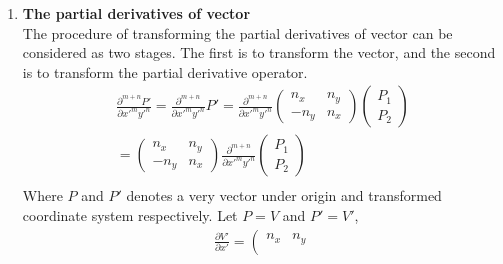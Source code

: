 \documentclass[review]{elsarticle}
\begin{document}
\begin{enumerate}
\begin{equation}
\begin{gathered}
				+\left(n_x^2-n_y^2\right)\frac{\partial^2}{\partial x\partial y} \right)P,
	\end{gathered}
	\end{equation}
	\begin{equation}\label{TPSPy2}
	\begin{gathered}
		\frac{\partial^2{P'}}{\partial{y'^2}} 
			= \left( n_y^2\frac{\partial^2}{\partial x^2}-2n_xn_y\frac{\partial^2}{\partial x\partial y}
				+n_x^2\frac{\partial^2}{\partial y^2}\right)P.
	\end{gathered}
	\end{equation}
	\item \textbf{The partial derivatives of vector}\\
	The procedure of transforming the partial derivatives of vector can be considered as two stages. The first is to transform the vector, and the second is to transform the partial derivative operator. 
	\begin{equation}\label{TPVectorPxmyn}
	\begin{gathered}
		\frac{\partial^{m+n}P'}{\partial x'^my'^n} = \frac{\partial^{m+n}}{\partial x'^my'^n}P'
		=\frac{\partial^{m+n}}{\partial x'^my'^n}\left(\begin{array}{cc}
													n_x & n_y \\
													-n_y & n_x
				\end{array}\right)\left(\begin{array}{c}
					P_1 \\ P_2
				\end{array}\right) \\
		=\left(\begin{array}{cc}
			n_x & n_y \\
			-n_y & n_x
		 \end{array}\right)\frac{\partial^{m+n}}{\partial x'^my'^n}\left(\begin{array}{c}
			P_1 \\ P_2
		 \end{array}\right) \\
	\end{gathered}
	\end{equation}
	Where $P$ and $P'$ denotes a very vector under origin and transformed coordinate system respectively. Let $P=V$ and $P'=V'$, 
	\begin{equation}\label{TPVPx}
	\begin{gathered}
		\frac{\partial{V'}}{\partial{x'}}
			=\left(\begin{array}{cc}
						n_x & n_y \\

\end{array}
\end{gathered}
\end{equation}
\end{enumerate}
\end{document}
